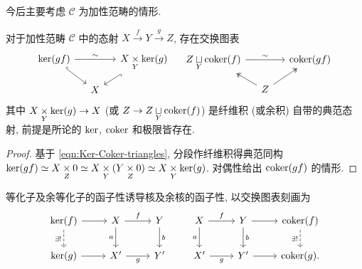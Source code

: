 今后主要考虑 $\mathcal{C}$ 为加性范畴的情形.

\begin{proposition}\label{prop:Ker-Coker-composite}
	对于加性范畴 $\mathcal{C}$ 中的态射 $X \xrightarrow{f} Y \xrightarrow{g} Z$, 存在交换图表
	\[\begin{tikzcd}[row sep=small, column sep=small]
		\Ker(gf) \arrow[rr, "\sim"] \arrow[hookrightarrow, rd] & & X \dtimes{Y} \Ker(g) \arrow[hookrightarrow, ld] \\
		& X &
	\end{tikzcd} \quad \begin{tikzcd}[row sep=small, column sep=small]
		Z \dsqcup{Y} \Coker(f) \arrow[rr, "\sim"] & & \Coker(gf) \\
		& Z \arrow[twoheadrightarrow, lu] \arrow[twoheadrightarrow, ru] &
	\end{tikzcd}\]
	其中 $X \underset{Y}{\times} \operatorname{ker}(g) \to X$ (或 $Z \to Z \underset{Y}{\sqcup} \operatorname{coker}(f)$) 是纤维积 (或余积) 自带的典范态射, 前提是所论的 $\operatorname{ker}$, $\operatorname{coker}$ 和极限皆存在.
\end{proposition}
\begin{proof}
	基于 \eqref{eqn:Ker-Coker-triangles}, 分段作纤维积得典范同构 $\operatorname{ker}(gf) \simeq X \underset{Z}{\times} 0 \simeq X \underset{Y}{\times} (Y \underset{Z}{\times} 0) \simeq X \underset{Y}{\times} \operatorname{ker}(g)$. 对偶性给出 $\operatorname{coker}(gf)$ 的情形.
\end{proof}

等化子及余等化子的函子性诱导核及余核的函子性, 以交换图表刻画为
\begin{equation}\label{eqn:Ker-Coker-functoriality}\begin{tikzcd}
		\Ker(f) \arrow[r] \arrow[dashrightarrow, d, "\exists!"'] & X \arrow[d, "a"'] \arrow[r, "f"] & Y \arrow[d, "b"] \\
		\Ker(g) \arrow[r] & X' \arrow[r, "g"'] & Y'
	\end{tikzcd} \qquad \begin{tikzcd}
		X \arrow[d, "a"'] \arrow[r, "f"] & Y \arrow[d, "b"] \arrow[r] & \Coker(f) \arrow[dashrightarrow, d, "\exists!"'] \\
		X' \arrow[r, "g"'] & Y' \arrow[r] & \Coker(g) .
\end{tikzcd}\end{equation}


